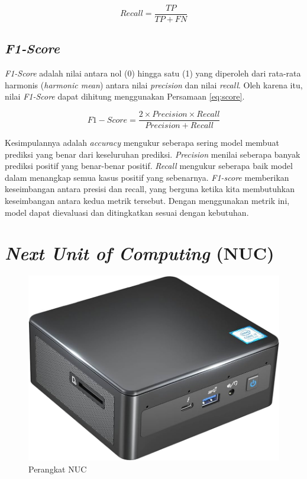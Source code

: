 \begin{equation}
  \label{eq:recall}
  Recall=\frac{TP}{TP+FN}
\end{equation}

\subsection{\emph{F1-Score}}
\label{subsec:score_klasifikasi}

\emph{F1-Score} adalah nilai antara nol (0) hingga satu (1) yang diperoleh dari rata-rata harmonis (\emph{harmonic mean}) antara nilai \emph{precision} dan nilai \emph{recall}. Oleh karena itu, nilai \emph{F1-Score} dapat dihitung menggunakan Persamaan \ref{eq:score}.

\begin{equation}
  \label{eq:score}
  F{1}{-}Score=\frac{2 \times Precision \times Recall}{Precision+Recall}
\end{equation}

Kesimpulannya adalah \emph{accuracy} mengukur seberapa sering model membuat prediksi yang benar dari keseluruhan prediksi. \emph{Precision} menilai seberapa banyak prediksi positif yang benar-benar positif. \emph{Recall} mengukur seberapa baik model dalam menangkap semua kasus positif yang sebenarnya. \emph{F1-score} memberikan keseimbangan antara presisi dan recall, yang berguna ketika kita membutuhkan keseimbangan antara kedua metrik tersebut. Dengan menggunakan metrik ini, model dapat dievaluasi dan ditingkatkan sesuai dengan kebutuhan.

\section{\textit{Next Unit of Computing} (NUC)}

\begin{figure} [ht] \centering
    \includegraphics[scale=0.2]{gambar/nuc.jpg}
    \caption{Perangkat NUC}
    \label{fig:Perangkat NUC}
\end{figure}

